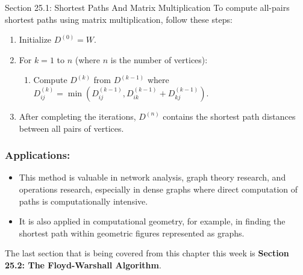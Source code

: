 \begin{notes}{Section 25.1: Shortest Paths And Matrix Multiplication}
    To compute all-pairs shortest paths using matrix multiplication, follow these steps:
    \begin{enumerate}
        \item Initialize $D^{(0)} = W$.
        \item For $k = 1$ to $n$ (where $n$ is the number of vertices):
            \begin{enumerate}
                \item Compute $D^{(k)}$ from $D^{(k-1)}$ where $D^{(k)}_{ij} = \min(D^{(k-1)}_{ij}, D^{(k-1)}_{ik} + D^{(k-1)}_{kj})$.
            \end{enumerate}
        \item After completing the iterations, $D^{(n)}$ contains the shortest path distances between all pairs of vertices.
    \end{enumerate}
    
    \subsubsection*{Applications:}
    
    \begin{itemize}
        \item This method is valuable in network analysis, graph theory research, and operations research, especially in dense graphs where direct computation of paths is computationally intensive.
        \item It is also applied in computational geometry, for example, in finding the shortest path within geometric figures represented as graphs.
    \end{itemize}    
\end{notes}

The last section that is being covered from this chapter this week is \textbf{Section 25.2: The Floyd-Warshall Algorithm}.

